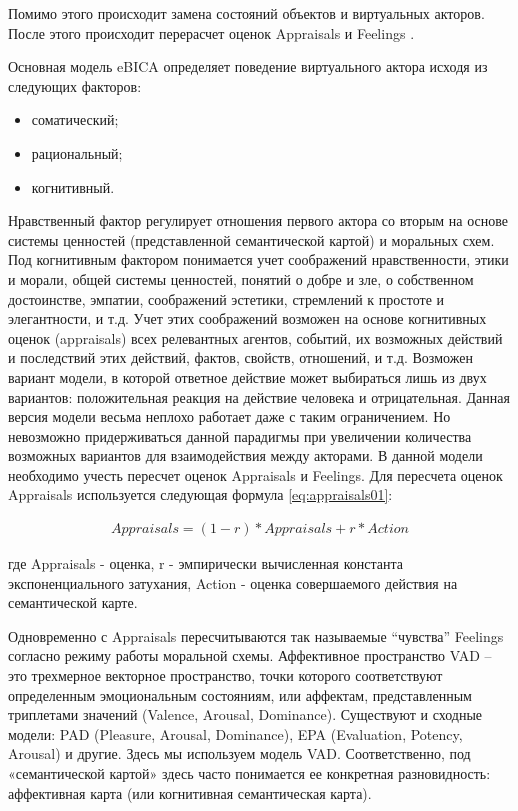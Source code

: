 Помимо этого происходит замена состояний объектов и виртуальных акторов. После этого происходит перерасчет оценок Appraisals и Feelings \cite{Samsonovich01}.

Основная модель eBICA определяет поведение виртуального актора исходя из следующих факторов:

\begin{itemize}
  \item соматический;
  \item рациональный;
  \item когнитивный.
\end{itemize}

Нравственный фактор регулирует отношения первого актора со вторым на основе системы ценностей (представленной семантической картой) 
и моральных схем. Под когнитивным фактором понимается учет соображений нравственности, этики и морали, общей системы ценностей, 
понятий о добре и зле, о собственном достоинстве, эмпатии, соображений эстетики, стремлений к простоте и элегантности, и т.д. 
Учет этих соображений возможен на основе когнитивных оценок (appraisals) всех релевантных агентов, событий, их возможных действий 
и последствий этих действий, фактов, свойств, отношений, и т.д. Возможен вариант модели, в которой ответное действие может выбираться 
лишь из двух вариантов: положительная реакция на действие человека и отрицательная. Данная версия модели весьма неплохо работает даже 
с таким ограничением. Но невозможно придерживаться данной парадигмы при увеличении количества возможных вариантов для взаимодействия 
между акторами. В данной модели необходимо учесть пересчет оценок Appraisals и Feelings. Для пересчета оценок Appraisals используется 
следующая формула \ref{eq:appraisals01}:

\begin{equation}
  \begin{gathered}
    Appraisals=(1-r)*Appraisals+r*Action
  \end{gathered}
  \label{eq:appraisals01}
\end{equation}

где Appraisals - оценка, 
r - эмпирически вычисленная константа экспоненциального затухания, 
Action - оценка совершаемого действия на семантической карте.

Одновременно с Appraisals пересчитываются так называемые “чувства” Feelings согласно режиму работы моральной схемы.
Аффективное пространство VAD – это трехмерное векторное пространство, точки которого соответствуют определенным эмоциональным 
состояниям, или аффектам, представленным триплетами значений (Valence, Arousal, Dominance). 
Существуют и сходные модели: PAD (Pleasure, Arousal, Dominance), EPA (Evaluation, Potency, Arousal) и другие. 
Здесь мы используем модель VAD. Соответственно, под «семантической картой» здесь часто понимается ее конкретная 
разновидность: аффективная карта (или когнитивная семантическая карта).

